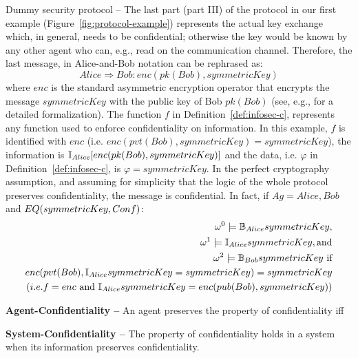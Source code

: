 \begin{example}{Dummy security protocol --}
	The last part (part III) of the protocol in our first example
	(Figure~\ref{fig:protocol-example}) represents the actual key exchange
	which, in general, needs to be confidential; otherwise the key would be
	known by any other agent who can, e.g., read on the communication
	channel.  Therefore, the last message, in Alice-and-Bob notation can be
	rephrased as: \begin{displaymath} Alice\Rightarrow Bob: enc(pk(Bob),
	symmetricKey) \end{displaymath} where $enc$ is the standard asymmetric
	encryption operator that encrypts the message $symmetricKey$ with the
	public key of Bob $pk(Bob)$ (see, e.g.,
	\autocite{Rocchetto2017interpolation} for a detailed formalization).
	The function $f$ in Definition~\ref{def:infosec-c}, represents any
	function used to enforce confidentiality on information.  In this
	example, $f$ is identified with $enc$ (i.e.
	$enc(pvt(Bob),symmetricKey)=symmetricKey$), the information is
	$\mathbb{I}_{Alice}{[enc(pk(Bob),symmetricKey)]}$ and the data, i.e.
	$\varphi$ in Definition~\ref{def:infosec-c}, is $\varphi=symmetricKey$.
	In the perfect cryptography assumption, and assuming for simplicity
	that the logic of the whole protocol preserves confidentiality, the
	message is confidential. In fact, if $Ag={Alice, Bob}$ and $EQ(symmetricKey,Conf)$:
	\begin{align*}
		\omega^0\models\mathbb{B}_{Alice}{symmetricKey},\\
		\omega^1\models\mathbb{I}_{Alice}{symmetricKey}, \text{and}\\
		\omega^2\models\mathbb{B}_{Bob}{symmetricKey} ~\text{if} \\
		enc(pvt(Bob), \mathbb{I}_{Alice}{symmetricKey}=symmetricKey)=symmetricKey\\
		(i.e. f=enc ~\text{and}~ \mathbb{I}_{Alice}{symmetricKey}=enc(pub(Bob),symmetricKey))\\
	\end{align*}
\end{example}

\begin{definition}{\bf Agent-Confidentiality --}\label{def:confidentiality}
An agent preserves the property of confidentiality iff 
\end{definition}

\begin{definition}{\bf System-Confidentiality --}\label{def:confidentiality}
	The property of confidentiality holds in a system when its information
	preserves confidentiality.
\end{definition}


